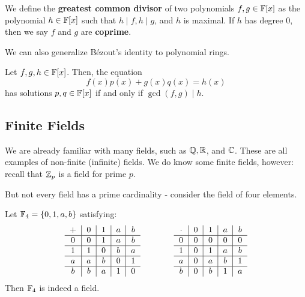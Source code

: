 \documentclass{article}
\begin{document}
\begin{defn}
    We define the \textbf{greatest common divisor} of two polynomials $ f, g \in \mathbb{F}[x] $ as
    the polynomial $ h \in \mathbb{F}[x] $ such that $ h \mid f, h \mid g $, and $ h $ is maximal. \vsp
    If $ h $ has degree $ 0 $, then we say $ f $ and $ g $ are \textbf{coprime}.
\end{defn}

We can also generalize B\'ezout's identity to polynomial rings.

\begin{thm}[title=Bezout's Identity for polynomial rings]
    Let $ f, g, h \in \mathbb{F}[x] $. Then, the equation
    \begin{equation*}
        f(x)p(x) + g(x)q(x) = h(x)
    \end{equation*}
    has solutions $ p, q \in \mathbb{F}[x] $ if and only if $ \gcd(f, g) \mid h $.
\end{thm}

\subsection{Finite Fields}

We are already familiar with many fields, such as $ \mathbb{Q}, \mathbb{R} $, and $ \mathbb{C} $.
These are all examples of non-finite (infinite) fields.
We do know some finite fields, however: recall that $ \mathbb{Z}_{p} $ is a field for prime $ p $.

But not every field has a prime cardinality - consider the field of four elements.

\begin{xmp}[source=Primary Source Material]
    Let $ \mathbb{F}_{4} = \left\{{0, 1, a, b}\right\} $ satisfying:
    \begin{equation*}
        \begin{tabular}{c|c|c|c|c}
            $ + $ & $ 0 $ & $ 1 $ & $ a $ & $ b $ \\ \hline
            $ 0 $ & $ 0 $ & $ 1 $ & $ a $ & $ b $ \\ \hline
            $ 1 $ & $ 1 $ & $ 0 $ & $ b $ & $ a $ \\ \hline
            $ a $ & $ a $ & $ b $ & $ 0 $ & $ 1 $ \\ \hline
            $ b $ & $ b $ & $ a $ & $ 1 $ & $ 0 $
        \end{tabular} \qquad \qquad
        \begin{tabular}{c|c|c|c|c}
            $ \cdot $ & $ 0 $ & $ 1 $ & $ a $ & $ b $ \\ \hline
                $ 0 $ & $ 0 $ & $ 0 $ & $ 0 $ & $ 0 $ \\ \hline
                $ 1 $ & $ 0 $ & $ 1 $ & $ a $ & $ b $ \\ \hline
                $ a $ & $ 0 $ & $ a $ & $ b $ & $ 1 $ \\ \hline
                $ b $ & $ 0 $ & $ b $ & $ 1 $ & $ a $
        \end{tabular}
    \end{equation*}
    Then $ \mathbb{F}_{4} $ is indeed a field.
\end{xmp}
\end{document}
